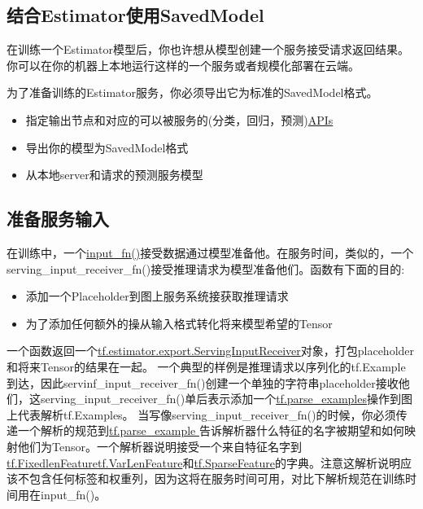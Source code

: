 \subsection{结合Estimator使用SavedModel}
在训练一个Estimator模型后，你也许想从模型创建一个服务接受请求返回结果。你可以在你的机器上本地运行这样的一个服务或者规模化部署在云端。

为了准备训练的Estimator服务，你必须导出它为标准的SavedModel格式。
\begin{itemize}
\item 指定输出节点和对应的可以被服务的(分类，回归，预测)\href{https://github.com/tensorflow/serving/blob/master/tensorflow_serving/apis/prediction_service.proto}{APIs}
\item 导出你的模型为SavedModel格式
\item 从本地server和请求的预测服务模型
\end{itemize}
\subsection{准备服务输入}
在训练中，一个\href{https://www.tensorflow.org/get_started/input_fn?hl=zh-cn}{input\_fn()}接受数据通过模型准备他。在服务时间，类似的，一个serving\_input\_receiver\_fn()接受推理请求为模型准备他们。函数有下面的目的:
\begin{itemize}
\item 添加一个Placeholder到图上服务系统接获取推理请求
\item 为了添加任何额外的操从输入格式转化将来模型希望的Tensor 
\end{itemize}
一个函数返回一个\href{https://www.tensorflow.org/api_docs/python/tf/estimator/export/ServingInputReceiver?hl=zh-cn}{tf.estimator.export.ServingInputReceiver}对象，打包placeholder和将来Tensor的结果在一起。
一个典型的样例是推理请求以序列化的tf.Example到达，因此servinf\_input\_receiver\_fn()创建一个单独的字符串placeholder接收他们，这serving\_input\_receiver\_fn()单后表示添加一个\href{https://www.tensorflow.org/api_docs/python/tf/parse_example?hl=zh-cn}{tf.parse\_examples}操作到图上代表解析tf.Examples。
当写像serving\_input\_receiver\_fn()的时候，你必须传递一个解析的规范到\href{https://www.tensorflow.org/api_docs/python/tf/parse_example?hl=zh-cn}{tf.parse\_example }告诉解析器什么特征的名字被期望和如何映射他们为Tensor。一个解析器说明接受一个来自特征名字到\href{https://www.tensorflow.org/api_docs/python/tf/FixedLenFeature?hl=zh-cn}{tf.FixedlenFeature}\href{https://www.tensorflow.org/api_docs/python/tf/VarLenFeature?hl=zh-cn}{tf.VarLenFeature}和\href{https://www.tensorflow.org/api_docs/python/tf/SparseFeature?hl=zh-cn}{tf.SparseFeature}的字典。注意这解析说明应该不包含任何标签和权重列，因为这将在服务时间可用，对比下解析规范在训练时间用在input\_fn()。

